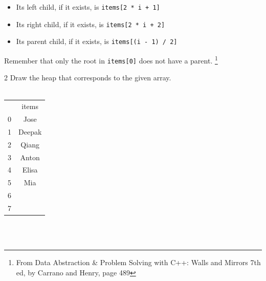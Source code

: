 \documentclass[a4paper,12pt,oneside]{book}
\newcounter{question}
\begin{document}
    \begin{itemize}
        \item   Its left child, if it exists, is \texttt{items[2 * i + 1]}
        \item   Its right child, if it exists, is \texttt{items[2 * i + 2]}
        \item   Its parent child, if it exists, is \texttt{items[(i - 1) / 2]}
    \end{itemize}
    Remember that only the root in \texttt{items[0]} does not have a parent.
    \footnote{ From Data Abstraction \& Problem Solving with C++: Walls and Mirrors 7th ed, by Carrano and Henry, page 489 }

    \newpage

    \begin{question}{\thequestion}{2}
        Draw the heap that corresponds to the given array.
        ~\\~\\
        \begin{tabular}{r c}
            & items
            \\ \cline{2-2} 
            0 & \multicolumn{1}{|c|}{Jose}
            \\ \cline{2-2}
            1 & \multicolumn{1}{|c|}{Deepak}
            \\ \cline{2-2}
            2 & \multicolumn{1}{|c|}{Qiang}
            \\ \cline{2-2}
            3 & \multicolumn{1}{|c|}{Anton}
            \\ \cline{2-2}
            4 & \multicolumn{1}{|c|}{Elisa}
            \\ \cline{2-2}
            5 & \multicolumn{1}{|c|}{Mia}
            \\ \cline{2-2}
            6 & \multicolumn{1}{|c|}{}
            \\ \cline{2-2}
            7 & \multicolumn{1}{|c|}{}
            \\ \cline{2-2}
        \end{tabular}
    \end{question} 

    ~\\~\\
    
    \hrulefill
\end{document}
